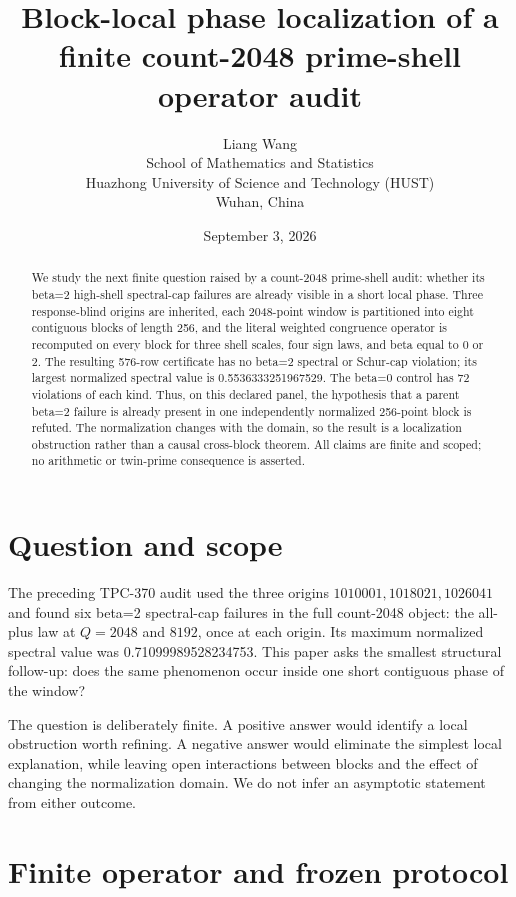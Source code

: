 \documentclass[10pt]{article}
\title{Block-local phase localization of a finite\newline
count-2048 prime-shell operator audit}
\author{Liang Wang\\
School of Mathematics and Statistics\\
Huazhong University of Science and Technology (HUST)\\
Wuhan, China}
\date{September 3, 2026}
\begin{document}
\maketitle

\begin{abstract}
We study the next finite question raised by a count-2048 prime-shell audit:
whether its beta=2 high-shell spectral-cap failures are already visible in a
short local phase.  Three response-blind origins are inherited, each 2048-point
window is partitioned into eight contiguous blocks of length 256, and the
literal weighted congruence operator is recomputed on every block for three
shell scales, four sign laws, and beta equal to 0 or 2.  The resulting 576-row
certificate has no beta=2 spectral or Schur-cap violation; its largest
normalized spectral value is 0.5536333251967529.  The beta=0 control has 72
violations of each kind.  Thus, on this declared panel, the hypothesis that a
parent beta=2 failure is already present in one independently normalized
256-point block is refuted.  The normalization changes with the domain, so the
result is a localization obstruction rather than a causal cross-block theorem.
All claims are finite and scoped; no arithmetic or twin-prime consequence is
asserted.
\end{abstract}

\section{Question and scope}

The preceding TPC-370 audit used the three origins
\(
 1010001,1018021,1026041
\)
and found six beta=2 spectral-cap failures in the full count-2048 object:
the all-plus law at \(Q=2048\) and \(8192\), once at each origin.  Its maximum
normalized spectral value was 0.71099989528234753.  This paper asks the
smallest structural follow-up: does the same phenomenon occur inside one
short contiguous phase of the window?

The question is deliberately finite.  A positive answer would identify a
local obstruction worth refining.  A negative answer would eliminate the
simplest local explanation, while leaving open interactions between blocks and
the effect of changing the normalization domain.  We do not infer an
asymptotic statement from either outcome.

\section{Finite operator and frozen protocol}
\end{document}
